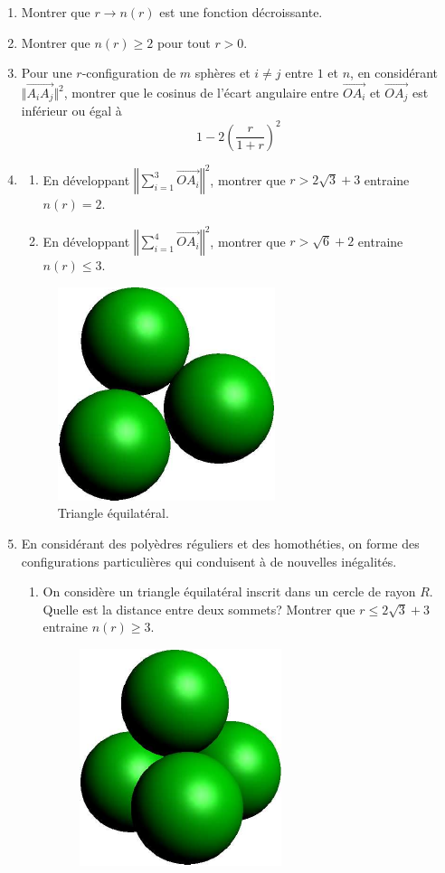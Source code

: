 \begin{enumerate}
 \item Montrer que $r\rightarrow n(r)$ est une fonction décroissante.
 \item Montrer que $n(r)\geq 2$ pour tout $r>0$.
 \item Pour une $r$-configuration de $m$ sphères et $i\neq j$ entre $1$ et $n$, en considérant $\Vert \overrightarrow{A_iA_j}\Vert^2$, montrer que le cosinus de l'écart angulaire entre $\overrightarrow{OA_i}$ et $\overrightarrow{OA_j}$ est inférieur ou égal à
\begin{displaymath}
 1-2\left( \frac{r}{1+r}\right)^2
\end{displaymath}
\item 
\begin{enumerate}
 \item En développant $\left\Vert \sum_{i=1}^3 \overrightarrow{OA_i}\right \Vert^2$, montrer que $r> 2\sqrt{3}+3$ entraine $n(r)=2$.
 \item En développant $\left\Vert \sum_{i=1}^4 \overrightarrow{OA_i}\right \Vert^2$, montrer que $r>\sqrt{6}+2$ entraine $n(r)\leq 3$.
\end{enumerate}
\begin{figure}[h!t]
 \centering
 \includegraphics{./Esphertan_2.pdf}
 \caption{Triangle équilatéral.}
 \label{fig:Esphertan_2}
\end{figure}
\item En considérant des polyèdres réguliers et des homothéties, on forme des configurations particulières qui conduisent à de nouvelles inégalités.
\begin{enumerate}
 \item On considère un triangle équilatéral inscrit dans un cercle de rayon $R$. Quelle est la distance entre deux sommets? Montrer que $r\leq 2\sqrt{3}+3$ entraine $n(r)\geq 3$.
\begin{figure}[h!t]
 \centering
 \includegraphics{./Esphertan_3.pdf}

\end{figure}
\end{enumerate}
\end{enumerate}
